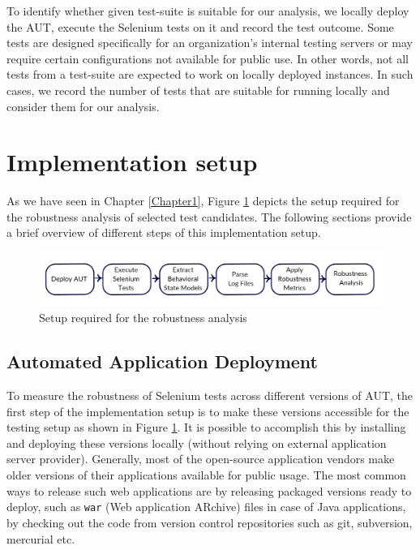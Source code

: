 To identify whether given test-suite is suitable for our analysis, we locally deploy the AUT, execute the Selenium tests on it and record the test outcome. Some tests are designed specifically for an organization's internal testing servers or may require certain configurations not available for public use. In other words, not all tests from a test-suite are expected to work on locally deployed instances. In such cases, we record the number of tests that are suitable for running locally and consider them for our analysis. 


\section{Implementation setup}
\label{implementationsetup}
As we have seen in Chapter \ref{Chapter1}, Figure \ref{fig:thesisoverview2} depicts the setup required for the robustness analysis of selected test candidates. The following sections provide a brief overview of different steps of this implementation setup.  
\begin{figure}[h]
	\centering	\includegraphics[width=\textwidth]{./Figures/thesisoverviewsmall.jpg}
	\caption{Setup required for the robustness analysis}
	\label{fig:thesisoverview2}
\end{figure} 

\subsection{Automated Application Deployment}
\label{sec:autoDeployment}




To measure the robustness of Selenium tests across different versions of AUT, the first step of the implementation setup is to make these versions accessible for the testing setup as shown in Figure \ref{fig:thesisoverview2}. It is possible to accomplish this by installing and deploying these versions locally (without relying on external application server provider). Generally, most of the open-source application vendors make older versions of their applications available for public usage. The most common ways to release such web applications are by releasing packaged versions ready to deploy, such as \texttt{war} (Web application ARchive) files in case of Java applications, by checking out the code from version control repositories such as git, subversion, mercurial etc.


